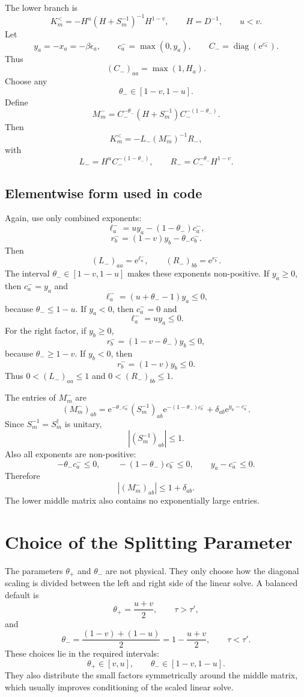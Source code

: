 \documentclass[11pt]{article}
\newcommand{\e}{\mathrm{e}}
\newcommand{\1}{\mathbb{1}}
\newcommand{\diag}{\operatorname{diag}}
\newcommand{\abs}[1]{\left|#1\right|}
\newcommand{\br}[1]{\left(#1\right)}
\begin{document}
The lower branch is
\[
    K_m^<
    =
    -H^u(H+S_m^{-1})^{-1}H^{1-v},
    \qquad
    H=D^{-1},
    \qquad
    u<v.
\]
Let
\[
    y_a=-x_a=-\beta\epsilon_a,
    \qquad
    c_a^-=\max(0,y_a),
    \qquad
    C_-=\diag\br{\e^{c_a^-}}.
\]
Thus
\[
    (C_-)_{aa}=\max(1,H_a).
\]
Choose any
\[
    \theta_-\in[1-v,1-u].
\]
Define
\[
    \boxed{
    M_m^-
    =
    C_-^{-\theta_-}
    \br{H+S_m^{-1}}
    C_-^{-(1-\theta_-)}.
    }
\]
Then
\[
    \boxed{
    K_m^<
    =
    -L_-(M_m^-)^{-1}R_-,
    }
\]
with
\[
    L_-
    =
    H^u C_-^{-(1-\theta_-)},
    \qquad
    R_-
    =
    C_-^{-\theta_-}H^{1-v}.
\]

\subsection{Elementwise form used in code}

Again, use only combined exponents:
\[
    \ell_a^-
    =
    uy_a-(1-\theta_-)c_a^-,
\]
\[
    r_b^-
    =
    (1-v)y_b-\theta_- c_b^-.
\]
Then
\[
    (L_-)_{aa}=\e^{\ell_a^-},
    \qquad
    (R_-)_{bb}=\e^{r_b^-}.
\]
The interval \(\theta_-\in[1-v,1-u]\) makes these exponents non-positive.
If \(y_a\ge 0\), then \(c_a^-=y_a\) and
\[
    \ell_a^-=(u+\theta_- -1)y_a\le 0,
\]
because \(\theta_-\le 1-u\).  If \(y_a<0\), then \(c_a^-=0\) and
\[
    \ell_a^-=uy_a\le 0.
\]
For the right factor, if \(y_b\ge 0\),
\[
    r_b^-=(1-v-\theta_-)y_b\le 0,
\]
because \(\theta_-\ge 1-v\).  If \(y_b<0\), then
\[
    r_b^-=(1-v)y_b\le 0.
\]
Thus \(0<(L_-)_{aa}\le 1\) and \(0<(R_-)_{bb}\le 1\).

The entries of \(M_m^-\) are
\[
    \boxed{
    (M_m^-)_{ab}
    =
    \e^{-\theta_- c_a^-}
    (S_m^{-1})_{ab}
    \e^{-(1-\theta_-)c_b^-}
    +
    \delta_{ab}\e^{y_a-c_a^-}.
    }
\]
Since \(S_m^{-1}=S_m^\dagger\) is unitary,
\[
    \abs{(S_m^{-1})_{ab}}\le 1.
\]
Also all exponents are non-positive:
\[
    -\theta_-c_a^-\le 0,
    \qquad
    -(1-\theta_-)c_b^-\le 0,
    \qquad
    y_a-c_a^-\le 0.
\]
Therefore
\[
    \abs{(M_m^-)_{ab}}\le 1+\delta_{ab}.
\]
The lower middle matrix also contains no exponentially large entries.

\section{Choice of the Splitting Parameter}

The parameters \(\theta_+\) and \(\theta_-\) are not physical.  They only
choose how the diagonal scaling is divided between the left and right side
of the linear solve.  A balanced default is
\[
    \theta_+ = \frac{u+v}{2},
    \qquad
    \tau>\tau',
\]
and
\[
    \theta_- = \frac{(1-v)+(1-u)}{2}
    =
    1-\frac{u+v}{2},
    \qquad
    \tau<\tau'.
\]
These choices lie in the required intervals:
\[
    \theta_+\in[v,u],
    \qquad
    \theta_-\in[1-v,1-u].
\]
They also distribute the small factors symmetrically around the middle
matrix, which usually improves conditioning of the scaled linear solve.
\end{document}
